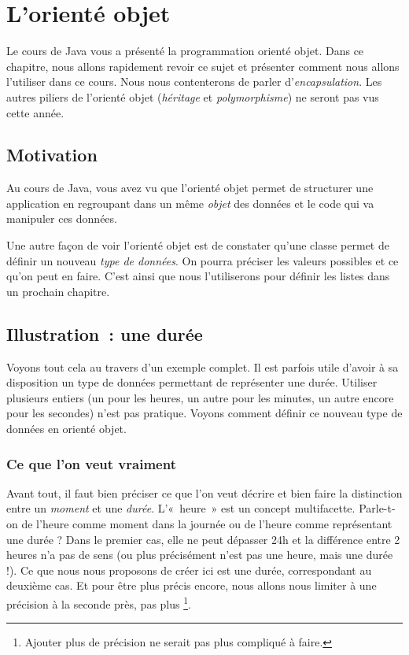 \chapter{L'orienté objet}

	Le cours de Java vous a présenté la programmation orienté objet.
	Dans ce chapitre, nous allons rapidement revoir ce sujet
	et présenter comment nous allons l'utiliser dans ce cours.
	Nous nous contenterons de parler d'\textit{encapsulation}. 
	Les autres piliers de l'orienté objet 
	(\textit{héritage} et \textit{polymorphisme}) 
	ne seront pas vus cette année.

\section{Motivation}

	Au cours de Java,
	vous avez vu que l'orienté objet permet de structurer une
	application en regroupant dans un même \emph{objet}
	des données et le code qui va manipuler ces données.
	
	Une autre façon de voir l'orienté objet
	est de constater qu'une classe permet de définir 
	un nouveau \emph{type de données}.
	On pourra préciser les valeurs possibles 
	et ce qu'on peut en faire.
	C'est ainsi que nous l'utiliserons pour définir les listes 
	dans un prochain chapitre.

	
\section{Illustration~: une durée}

	Voyons tout cela au travers d'un exemple complet.
	Il est parfois utile d'avoir à sa disposition un type
	de données permettant de représenter une durée.	
	Utiliser plusieurs entiers (un pour les heures, un autre pour les minutes,
	un autre encore pour les secondes) n'est pas pratique.
	Voyons comment définir ce nouveau type de données en orienté objet.
	
	\subsection{Ce que l’on veut vraiment}
	
		Avant tout, il faut bien préciser ce que l’on veut décrire
		et bien faire la distinction entre un \emph{moment} et une \emph{durée}.
		L’«~heure~» est un concept multifacette. 
		Parle-t-on de l’heure comme moment dans la journée 
		ou de l’heure comme représentant une durée ? 
		Dans le premier cas, elle ne peut dépasser 24h 
		et la différence entre 2 heures n’a pas de sens 
		(ou plus précisément n’est pas une heure, mais une durée !).
		Ce que nous nous proposons de créer ici est une durée,
		correspondant au deuxième cas.
		Et pour être plus précis encore,
		nous allons nous limiter à une précision à la seconde près,
		pas plus%
		\footnote{%
			Ajouter plus de précision ne serait pas plus compliqué à faire.%
		}.

